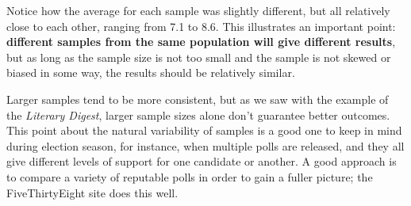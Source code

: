 Notice how the average for each sample was slightly different, but all relatively close to each other, ranging from 7.1 to 8.6.  This illustrates an important point: \textbf{different samples from the same population will give different results}, but as long as the sample size is not too small and the sample is not skewed or biased in some way, the results should be relatively similar.

Larger samples tend to be more consistent, but as we saw with the example of the \emph{Literary Digest}, larger sample sizes alone don't guarantee better outcomes.\\

This point about the natural variability of samples is a good one to keep in mind during election season, for instance, when multiple polls are released, and they all give different levels of support for one candidate or another.  A good approach is to compare a variety of reputable polls in order to gain a fuller picture; the FiveThirtyEight site does this well.